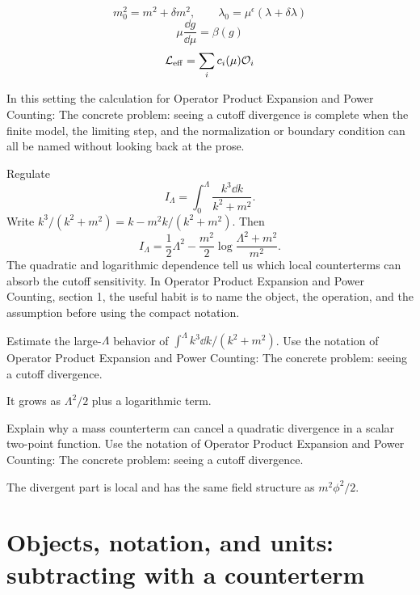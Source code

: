 \[
  m_0^2=m^2+\delta m^2,\qquad \lambda_0=\mu^\epsilon(\lambda+\delta\lambda)
\]
\[
  \mu\frac{\dd g}{\dd\mu}=\beta(g)
\]
\[
  \mathcal L_{\mathrm{eff}}=\sum_i c_i(\mu)\mathcal O_i
\]

In this setting the calculation for Operator Product Expansion and Power Counting: The concrete problem: seeing a cutoff divergence is complete when the finite model, the limiting step, and the normalization or boundary condition can all be named without looking back at the prose.




\begin{example}
Regulate
\[
  I_\Lambda=\int_0^\Lambda\frac{k^3\dd k}{k^2+m^2}.
\]
Write \(k^3/(k^2+m^2)=k-m^2k/(k^2+m^2)\).  Then
\[
  I_\Lambda=\frac12\Lambda^2-\frac{m^2}{2}\log\frac{\Lambda^2+m^2}{m^2}.
\]
The quadratic and logarithmic dependence tell us which local counterterms can absorb the cutoff sensitivity.  In Operator Product Expansion and Power Counting, section 1, the useful habit is to name the object, the operation, and the assumption before using the compact notation.
\end{example}



\begin{exercise}
Estimate the large-\(\Lambda\) behavior of \(\int^\Lambda k^3\dd k/(k^2+m^2)\).  Use the notation of Operator Product Expansion and Power Counting: The concrete problem: seeing a cutoff divergence.
\begin{answer}
It grows as \(\Lambda^2/2\) plus a logarithmic term.
\end{answer}
\end{exercise}

\begin{exercise}
Explain why a mass counterterm can cancel a quadratic divergence in a scalar two-point function.  Use the notation of Operator Product Expansion and Power Counting: The concrete problem: seeing a cutoff divergence.
\begin{answer}
The divergent part is local and has the same field structure as \(m^2\phi^2/2\).
\end{answer}
\end{exercise}



\section{Objects, notation, and units: subtracting with a counterterm}

